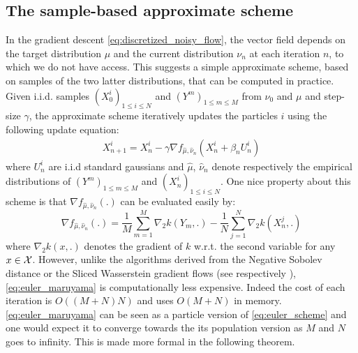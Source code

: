 
\subsection{The sample-based approximate scheme}\label{sec:sample_based}

In the gradient descent \eqref{eq:discretized_noisy_flow}, the vector field depends on the target distribution $\mu$ and the current distribution $\nu_n$ at each iteration $n$, to which we do not have access. This suggests a simple approximate scheme, based on samples of the two latter distributions, that can be computed in practice. 
Given i.i.d. samples $(X^i_0)_{1\leq i\leq N}$ and $(Y^{m})_{1\leq m\leq M}$ from $\nu_0$ and $\mu$ and step-size $\gamma$, the approximate scheme iteratively updates the particles $i$ using the following update equation: 
\begin{align}\label{eq:euler_maruyama}
X_{n+1}^{i} = X_n^i -\gamma \nabla f_{\hat{\mu},\hat{\nu}_n}(X_n^i+\beta_n U_n^i)
\end{align}
where $U_{n}^{i}$ are i.i.d standard gaussians and $\hat{\mu}$, $\hat{\nu}_n$ denote respectively the empirical distributions of $(Y^{m})_{1\leq m\leq M}$ and $(X^i_n)_{1\leq i\leq N}$. One nice property about this scheme is that $\nabla f_{\hat{\mu},\hat{\nu}_n}(.)$ can be evaluated easily by:
\begin{equation}
\nabla f_{\hat{\mu},\hat{\nu}_n}(.) = \frac{1}{M}\sum\limits_{m=1}^M \nabla_2 k(Y_m,.)-\frac{1}{N}\sum\limits_{j=1}^N \nabla_2 k(X_n^j,.)
\end{equation}
where $\nabla_2k(x,.)$ denotes the gradient of $k$ w.r.t. the second variable for any $x \in {{\mathcal X}}$.
However, unlike the algorithms derived from the Negative Sobolev distance or the Sliced Wasserstein gradient flows (see respectively \cite{Mroueh:2019,Simsekli:2018}), \cref{eq:euler_maruyama} is computationally less expensive. Indeed the cost of each iteration is $O((M+N)N)$ and uses $O(M+N)$ in memory.
\cref{eq:euler_maruyama} can be seen as a particle version of \cref{eq:euler_scheme} and one would expect it to converge towards the its population version as $M$ and $N$ goes to infinity. This is made more formal in the following theorem.
